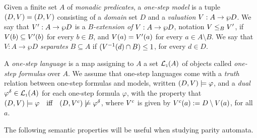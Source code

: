 \begin{definition}\label{def:one-step}
Given a finite set $A$ of \emph{monadic predicates}, a \emph{one-step model} is a tuple $(D, V) = (D,V)$
consisting of a \emph{domain} set $D$ and a \emph{valuation} $V : A \to \wp D$. We say that $V' : A \to \wp D$
is a \emph{$B$-extension of} $V : A \to \wp D$, notation $V \leq_{B} V'$, if $V(b) \subseteq V'(b)$ for every $b \in B$,
and $V(a) = V'(a)$ for every $a \in A \setminus B$. We say that $V: A \to \wp D$ \emph{separates} $B
\subseteq 
A$ if $(V^{-1}(d) \cap B) \leq 1$, for every $d \in D$.
%


A \emph{one-step language} is a map assigning to $A$ a set $\mathcal{L}_{\scriptscriptstyle 1}(A)$ of objects called \emph{one-step formulas} over $A$. We assume that one-step languages come with a \emph{truth} relation between one-step formulas and models, written $(D, V) \models \varphi$, and a \emph{dual} $\varphi^{\delta} \in \mathcal{L}_{\scriptscriptstyle 1}(A)$ for each one-step formula $\varphi$, with the property that $(D,\val) \models \varphi\quad \text{iff}\quad (D,\val^{c}) \not\models \varphi^{\delta}$, where $V^{c}$ is given by $V^{c}(a) \mathrel{:=} D \setminus V(a)$, for all $a$.
\end{definition}

The following semantic properties will be useful when studying parity automata.

